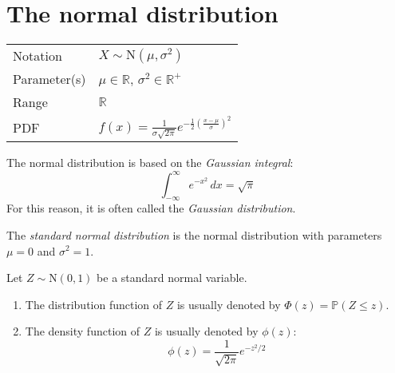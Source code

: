 \documentclass[lecture]{csm}
\newcommand{\prob}{\mathbb{P}}
\newcommand{\R}{\mathbb{R}}
\def\it{\item}
\def\ben{\begin{enumerate}}
\def\een{\end{enumerate}}
\begin{document}
\newpage
\section{The normal distribution}
\begin{center}
\begin{tabular}{ll}\hline
Notation			& $X\sim\text{N}(\mu,\sigma^2)$ \\
Parameter(s)		& $\mu\in\R$, $\sigma^2\in\R^{+}$ \\
Range			& $\R$ \\
PDF				& $f(x) = \displaystyle\frac{1}{\sigma\sqrt{2\pi}} e^{-\frac{1}{2}\left(\frac{x-\mu}{\sigma}\right)^2}$ \\[2ex] \hline 
\end{tabular}
\end{center}

The normal distribution is based on the \emph{Gaussian integral}:
\[
\int_{-\infty}^{\infty} e^{-x^2}\,dx = \sqrt{\pi}
\]
For this reason, it is often called the \emph{Gaussian distribution}.

\begin{definition}
The \emph{standard normal distribution} is the normal distribution with parameters $\mu=0$ and $\sigma^2=1$.
\end{definition}

\newpage

Let $Z\sim\text{N}(0,1)$ be a standard normal variable.
\ben
\it The distribution function of $Z$ is usually denoted by $\Phi(z) = \prob(Z\leq z)$.
\it The density function of $Z$ is usually denoted by $\phi(z)$:
\[
\phi(z) = \frac{1}{\sqrt{2\pi}} e^{-z^2/2}
\]
\een

\end{document}
